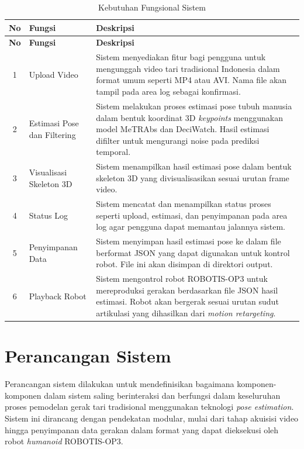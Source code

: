 \begin{longtable}{|c|p{5cm}|p{8cm}|}
\caption{Kebutuhan Fungsional Sistem}
\label{tab:kebutuhan_fungsionalitas} \\
\hline
\textbf{No} & \textbf{Fungsi} & \textbf{Deskripsi} \\
\hline
\endfirsthead

\hline
\textbf{No} & \textbf{Fungsi} & \textbf{Deskripsi} \\
\hline
\endhead

\hline
\endfoot

\hline
\endlastfoot

1 & Upload Video & Sistem menyediakan fitur bagi pengguna untuk mengunggah video tari tradisional Indonesia dalam format umum seperti MP4 atau AVI. Nama file akan tampil pada area log sebagai konfirmasi. \\
\hline
2 & Estimasi Pose dan Filtering & Sistem melakukan proses estimasi pose tubuh manusia dalam bentuk koordinat 3D \textit{keypoints} menggunakan model MeTRAbs dan DeciWatch. Hasil estimasi difilter untuk mengurangi noise pada prediksi temporal. \\
\hline
3 & Visualisasi Skeleton 3D & Sistem menampilkan hasil estimasi pose dalam bentuk skeleton 3D yang divisualisasikan sesuai urutan frame video. \\
\hline
4 & Status Log & Sistem mencatat dan menampilkan status proses seperti upload, estimasi, dan penyimpanan pada area log agar pengguna dapat memantau jalannya sistem. \\
\hline
5 & Penyimpanan Data & Sistem menyimpan hasil estimasi pose ke dalam file berformat JSON yang dapat digunakan untuk kontrol robot. File ini akan disimpan di direktori output. \\
\hline
6 & Playback Robot & Sistem mengontrol robot ROBOTIS-OP3 untuk mereproduksi gerakan berdasarkan file JSON hasil estimasi. Robot akan bergerak sesuai urutan sudut artikulasi yang dihasilkan dari \textit{motion retargeting}. \\
\hline

\end{longtable}


\section{Perancangan Sistem}

Perancangan sistem dilakukan untuk mendefinisikan bagaimana komponen-komponen dalam sistem saling berinteraksi dan berfungsi dalam keseluruhan proses pemodelan gerak tari tradisional menggunakan teknologi \textit{pose estimation}. Sistem ini dirancang dengan pendekatan modular, mulai dari tahap akuisisi video hingga penyimpanan data gerakan dalam format yang dapat dieksekusi oleh robot \textit{humanoid} ROBOTIS-OP3.

